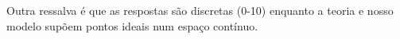 Outra ressalva é que as respostas são discretas (0-10) enquanto a teoria e nosso
modelo supõem pontos ideais num espaço contínuo.

